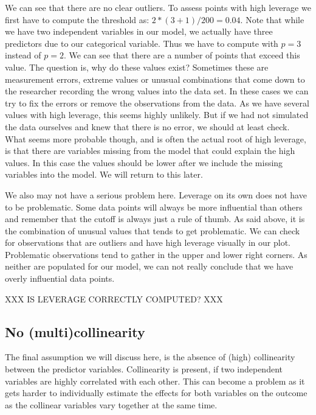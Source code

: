 \documentclass[
]{book}
\begin{document}
We can see that there are no clear outliers. To assess points with high leverage
we first have to compute the threshold as: \(2 * (3 + 1) / 200 = 0.04\). Note that
while we have two independent variables in our model, we actually have three
predictors due to our categorical variable. Thus we have to compute with \(p = 3\)
instead of \(p = 2\).
We can
see that there are a number of points that exceed this value. The question is,
why do these values exist? Sometimes these are measurement errors, extreme values
or unusual combinations that come down to the researcher recording the wrong
values into the data set. In these cases we can try to fix the errors or remove
the observations from the data. As we have several values with high leverage,
this seems highly unlikely. But if we had not simulated the data ourselves and
knew that there is no error, we should at least check. What seems more probable
though, and is often the actual root of high leverage, is that there are
variables missing from the model that could explain the high values.
In this case the values should be lower after we include the missing
variables into the model. We will return to this later.

We also may not have a serious problem here. Leverage on its own does not have
to be problematic. Some data points will always be more influential than others
and remember that the cutoff is always just a rule of thumb. As said above, it
is the combination of unusual values that tends to get problematic. We can check
for observations that are outliers and have high leverage visually in our plot.
Problematic observations tend to gather in the upper and lower right corners.
As neither are populated for our model, we can not really conclude that we have
overly influential data points.

XXX IS LEVERAGE CORRECTLY COMPUTED? XXX

\hypertarget{no-multicollinearity}{%
\subsection{No (multi)collinearity}\label{no-multicollinearity}}

The final assumption we will discuss here, is the absence of (high) collinearity
between the predictor variables. Collinearity is present, if two independent
variables are highly correlated with each other. This can become a problem as it
gets harder to individually estimate the effects for both variables on the
outcome as the collinear variables vary together at the same time.
\end{document}
